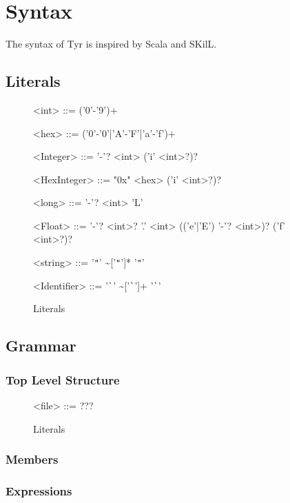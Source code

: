 \section{Syntax}

The syntax of Tyr is inspired by Scala and SKilL.


\subsection{Literals}


\begin{figure}
	\begin{grammar}
		<int> ::= ('0'-'9')+
		
		<hex> ::= ('0'-'0'|'A'-'F'|'a'-'f')+
		
		<Integer> ::= '-'? <int> ('i' <int>?)?
		
		<HexInteger> ::= "0x" <hex> ('i' <int>?)?
		
		<long> ::= '-'? <int> 'L'
		
		<Float> ::= '-'? <int>? '.' <int> (('e'|'E') '-'? <int>)? ('f' <int>?)?
		
		<string> ::= '\verb|"|' \textasciitilde['\verb|"|']* '\verb|"|'
		
		<Identifier> ::= '\verb|`|' \textasciitilde['\verb|`|']+ '\verb|`|'
	\end{grammar}
	\caption{Literals}
	\label{fig:syn:literals}
\end{figure}

\subsection{Grammar}

\subsubsection{Top Level Structure}

\begin{figure}
	\begin{grammar}
		<file> ::= ???
	\end{grammar}
	\caption{Literals}
	\label{fig:syn:top:level}
\end{figure}

\subsubsection{Members}

\subsubsection{Expressions}

